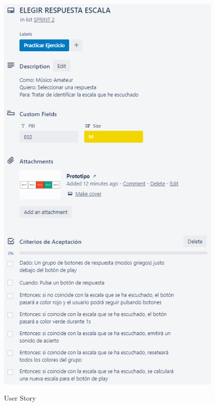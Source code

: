 \documentclass[12pt,twoside,titlepage]{report}
\begin{document}
{\begin{figure}[H]
    \centering
    \includegraphics[scale=1.3]{Scrum/User Stories/EscalasRespuestas}
    \label{fig:EscalasRespuestas}
    \caption{User Story}
\end{figure}

}
\end{document}
